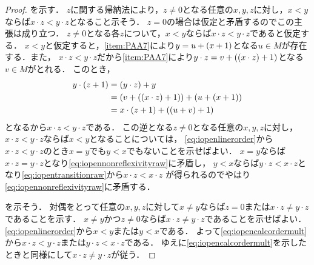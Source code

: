 \begin{proof}
	を示す．
	\(z\)に関する帰納法により，\(z \neq 0\)となる任意の\(x, y, z\)に対し，\(x < y\)ならば\(x \cdot z < y \cdot z\)となること示そう．
	\(z = 0\)の場合は仮定と矛盾するのでこの主張は成り立つ．
	\(z \neq 0\)となる各\(z\)について，\(x < y\)ならば\(x \cdot z < y \cdot z\)であると仮定する．
	\(x < y\)と仮定すると，\cref{item:PAA7}により\(y = u + \paren{x + 1}\)となる\(u \in M\)が存在する．また，
	\(x \cdot z < y \cdot z\)だから\cref{item:PAA7}により\(y \cdot z = v + \paren{\paren{x \cdot z} + 1}\)となる\(v \in M\)がとれる．
	このとき，
	\begin{align*}
		y \cdot \paren{z + 1}
		 & = \paren{y \cdot z} + y                                                 \\
		 & = \paren{v + \paren{\paren{x \cdot z} + 1}} + \paren{u + \paren{x + 1}} \\
		 & = x \cdot \paren{z + 1} + \paren{\paren{u + v} + 1}
	\end{align*}
	となるから\(x \cdot z < y \cdot z\)である．
	この逆となる\(z \neq 0\)となる任意の\(x, y, z\)に対し，\(x \cdot z < y \cdot z\)ならば\(x < y\)となることについては，
	\cref{eq:iopenlinerorder}から\(x \cdot z < y \cdot z\)のとき\(x = y\)でも\(y < x\)でもないことを示せばよい．
	\(x = y\)ならば\(x \cdot z = y \cdot z\)となり\cref{eq:iopennonreflexivityraw}に矛盾し，
	\(y < x\)ならば\(y \cdot z < x \cdot z\)となり\cref{eq:iopentransitionraw}から\(x \cdot z < x \cdot z\)
	が得られるのでやはり\cref{eq:iopennonreflexivityraw}に矛盾する．

	を示そう．
	対偶をとって任意の\(x, y, z\)に対して\(x \neq y\)ならば\(z = 0\)または\(x \cdot z \neq y \cdot z\)であることを示す．
	\(x \neq y\)かつ\(z \neq 0\)ならば\(x \cdot z \neq y \cdot z\)であることを示せばよい．
	\cref{eq:iopenlinerorder}から\(x < y\)または\(y < x\)である．
	よって\cref{eq:iopencalcordermult}から\(x \cdot z < y \cdot z\)または\(y \cdot z < x \cdot z\)である．
	ゆえに\cref{eq:iopencalcordermult}を示したときと同様にして\(x \cdot z \neq y \cdot z\)が従う．
\end{proof}


